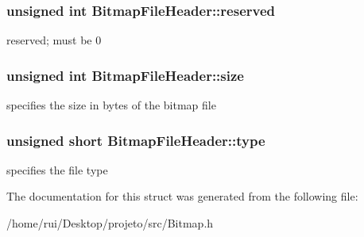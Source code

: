 \subsubsection[{\texorpdfstring{reserved}{reserved}}]{\setlength{\rightskip}{0pt plus 5cm}unsigned int Bitmap\+File\+Header\+::reserved}\hypertarget{structBitmapFileHeader_ab3833d77e2c28a216859a80ba8fac9f0}{}\label{structBitmapFileHeader_ab3833d77e2c28a216859a80ba8fac9f0}
reserved; must be 0 
\subsubsection[{\texorpdfstring{size}{size}}]{\setlength{\rightskip}{0pt plus 5cm}unsigned int Bitmap\+File\+Header\+::size}\hypertarget{structBitmapFileHeader_a0dcad71d9b17783c4d296c2c6d00ede0}{}\label{structBitmapFileHeader_a0dcad71d9b17783c4d296c2c6d00ede0}
specifies the size in bytes of the bitmap file 
\subsubsection[{\texorpdfstring{type}{type}}]{\setlength{\rightskip}{0pt plus 5cm}unsigned short Bitmap\+File\+Header\+::type}\hypertarget{structBitmapFileHeader_a139c2c2645bc00ddf4f5dc552872c1d1}{}\label{structBitmapFileHeader_a139c2c2645bc00ddf4f5dc552872c1d1}
specifies the file type 

The documentation for this struct was generated from the following file\+:\begin{DoxyCompactItemize}
\item 
/home/rui/\+Desktop/projeto/src/Bitmap.\+h\end{DoxyCompactItemize}
